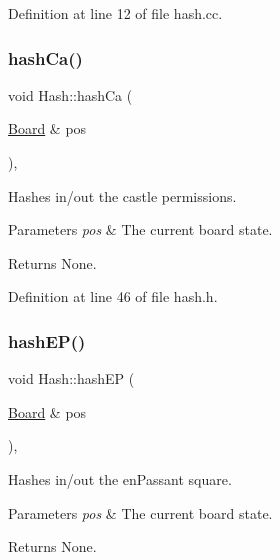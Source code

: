 Definition at line 12 of file hash.\+cc.

\mbox{\label{namespaceHash_a27755caeb25c1de2a9cd390440b73f37}} 
\subsubsection{\texorpdfstring{hash\+Ca()}{hashCa()}}
{\footnotesize\ttfamily void Hash\+::hash\+Ca (\begin{DoxyParamCaption}\item[{\mbox{\hyperlink{classBoard}{Board}} \&}]{pos }\end{DoxyParamCaption})\hspace{0.3cm}{\ttfamily [inline]}, {\ttfamily [noexcept]}}



Hashes in/out the castle permissions. 


\begin{DoxyParams}{Parameters}
{\em pos} & The current board state. \\
\hline
\end{DoxyParams}
\begin{DoxyReturn}{Returns}
None. 
\end{DoxyReturn}


Definition at line 46 of file hash.\+h.

\mbox{\label{namespaceHash_a8f7a084e23934f0acade5177e1925928}} 
\subsubsection{\texorpdfstring{hash\+E\+P()}{hashEP()}}
{\footnotesize\ttfamily void Hash\+::hash\+EP (\begin{DoxyParamCaption}\item[{\mbox{\hyperlink{classBoard}{Board}} \&}]{pos }\end{DoxyParamCaption})\hspace{0.3cm}{\ttfamily [inline]}, {\ttfamily [noexcept]}}



Hashes in/out the en\+Passant square. 


\begin{DoxyParams}{Parameters}
{\em pos} & The current board state. \\
\hline
\end{DoxyParams}
\begin{DoxyReturn}{Returns}
None. 
\end{DoxyReturn}


